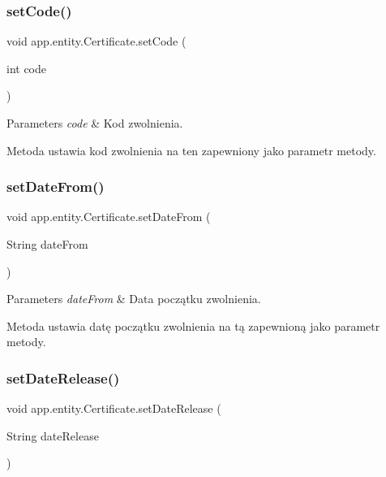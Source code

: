 \subsubsection{\texorpdfstring{setCode()}{setCode()}}
{\footnotesize\ttfamily void app.\+entity.\+Certificate.\+set\+Code (\begin{DoxyParamCaption}\item[{int}]{code }\end{DoxyParamCaption})}


\begin{DoxyParams}{Parameters}
{\em code} & Kod zwolnienia.\\
\hline
\end{DoxyParams}
Metoda ustawia kod zwolnienia na ten zapewniony jako parametr metody. \mbox{\label{classapp_1_1entity_1_1_certificate_a4bc54ac2ef765f5673a4552c094e9288}} 
\subsubsection{\texorpdfstring{setDateFrom()}{setDateFrom()}}
{\footnotesize\ttfamily void app.\+entity.\+Certificate.\+set\+Date\+From (\begin{DoxyParamCaption}\item[{String}]{date\+From }\end{DoxyParamCaption})}


\begin{DoxyParams}{Parameters}
{\em date\+From} & Data początku zwolnienia.\\
\hline
\end{DoxyParams}
Metoda ustawia datę początku zwolnienia na tą zapewnioną jako parametr metody. \mbox{\label{classapp_1_1entity_1_1_certificate_aa85e6e56d712342f68aa9af96342d085}} 
\subsubsection{\texorpdfstring{setDateRelease()}{setDateRelease()}}
{\footnotesize\ttfamily void app.\+entity.\+Certificate.\+set\+Date\+Release (\begin{DoxyParamCaption}\item[{String}]{date\+Release }\end{DoxyParamCaption})}


